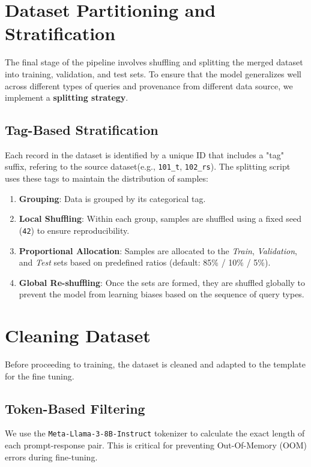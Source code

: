 \documentclass{article}
\begin{document}
\section{Dataset Partitioning and Stratification}
The final stage of the pipeline involves shuffling and splitting the merged dataset into training, validation, and test sets. To ensure that the model generalizes well across different types of queries and provenance from different data source, we implement a \textbf{splitting strategy}.

\subsection{Tag-Based Stratification}
Each record in the dataset is identified by a unique ID that includes a "tag" suffix, refering to the source dataset(e.g., \texttt{101\_t}, \texttt{102\_rs}). The splitting script uses these tags to maintain the distribution of samples:

\begin{enumerate}
    \item \textbf{Grouping}: Data is grouped by its categorical tag.
    \item \textbf{Local Shuffling}: Within each group, samples are shuffled using a fixed seed (\texttt{42}) to ensure reproducibility.
    \item \textbf{Proportional Allocation}: Samples are allocated to the \textit{Train}, \textit{Validation}, and \textit{Test} sets based on predefined ratios (default: 85\% / 10\% / 5\%).
    \item \textbf{Global Re-shuffling}: Once the sets are formed, they are shuffled globally to prevent the model from learning biases based on the sequence of query types.
\end{enumerate}


\section{Cleaning Dataset}
Before proceeding to training, the dataset is cleaned and adapted to the template for the fine tuning. 

\subsection{Token-Based Filtering}
We use the \texttt{Meta-Llama-3-8B-Instruct} tokenizer to calculate the exact length of each prompt-response pair. This is critical for preventing Out-Of-Memory (OOM) errors during fine-tuning.
\end{document}

